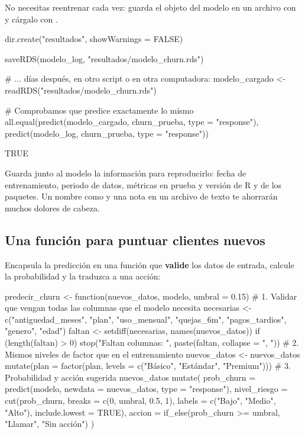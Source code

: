 No necesitas reentrenar cada vez: guarda el objeto del modelo en un archivo
 con  y cárgalo con .

\begin{rcode}
dir.create("resultados", showWarnings = FALSE)

saveRDS(modelo_log, "resultados/modelo_churn.rds")

# ... días después, en otro script o en otra computadora:
modelo_cargado <- readRDS("resultados/modelo_churn.rds")

# Comprobamos que predice exactamente lo mismo
all.equal(predict(modelo_cargado, churn_prueba, type = "response"),
          predict(modelo_log, churn_prueba, type = "response"))
\end{rcode}

\begin{rsalida}
[1] TRUE
\end{rsalida}

\begin{consejo}
Guarda junto al modelo la información para reproducirlo: fecha de
entrenamiento, periodo de datos, métricas en prueba y versión de R y de los
paquetes. Un nombre como  y una nota
en un archivo de texto te ahorrarán muchos dolores de cabeza.
\end{consejo}

\subsection{Una función para puntuar clientes nuevos}

Encapsula la predicción en una función que \textbf{valide} los datos de
entrada, calcule la probabilidad y la traduzca a una acción:

\begin{rcode}
predecir_churn <- function(nuevos_datos, modelo, umbral = 0.15) {
  # 1. Validar que vengan todas las columnas que el modelo necesita
  necesarias <- c("antiguedad_meses", "plan", "uso_mensual", "quejas_6m",
                  "pagos_tardios", "genero", "edad")
  faltan <- setdiff(necesarias, names(nuevos_datos))
  if (length(faltan) > 0) {
    stop("Faltan columnas: ", paste(faltan, collapse = ", "))
  }
  # 2. Mismos niveles de factor que en el entrenamiento
  nuevos_datos <- nuevos_datos %
    mutate(plan = factor(plan, levels = c("Básico", "Estándar",
                                          "Premium")))
  # 3. Probabilidad y acción sugerida
  nuevos_datos %
    mutate(
      prob_churn = predict(modelo, newdata = nuevos_datos,
                           type = "response"),
      nivel_riesgo = cut(prob_churn, breaks = c(0, umbral, 0.5, 1),
                         labels = c("Bajo", "Medio", "Alto"),
                         include.lowest = TRUE),
      accion = if_else(prob_churn >= umbral, "Llamar", "Sin acción")
    )
}
\end{rcode}

